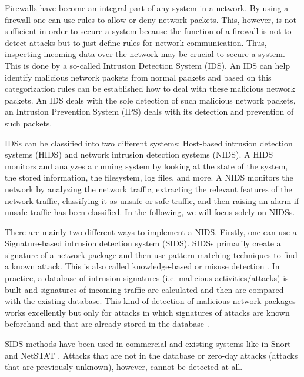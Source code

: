 \documentclass[]{article}
\begin{document}
	\noindent
	Firewalls have become an integral part of any system in a network. By using a firewall one can use rules to allow or deny network packets. This, however, is not sufficient in order to secure a system because the function of a firewall is not to detect attacks but to just define rules for network communication. Thus, inspecting incoming data over the network may be crucial to secure a system. This is done by a so-called Intrusion Detection System (IDS). An IDS can help identify malicious network packets from normal packets and based on this categorization rules can be established how to deal with these malicious network packets. An IDS deals with the sole detection of such malicious network packets, an Intrusion Prevention System (IPS) deals with its detection and prevention of such packets. 
	\newline
	
	\noindent
	IDSs can be classified into two different systems: Host-based intrusion detection systems (HIDS) and network intrusion detection systems (NIDS). A HIDS monitors and analyzes a running system by looking at the state of the system, the stored information, the filesystem, log files, and more. A NIDS monitors the network by analyzing the network traffic, extracting the relevant features of the network traffic, classifying it as unsafe or safe traffic, and then raising an alarm if unsafe traffic has been classified. In the following, we will focus solely on NIDSs.
	\newline
	
	\noindent
	There are mainly two different ways to implement a NIDS. Firstly, one can use a Signature-based intrusion detection system (SIDS). SIDSs primarily create a signature of a network package and then use pattern-matching techniques to find a known attack. This is also called knowledge-based or misuse detection \cite{10.1007/978-3-030-04503-6_14}. In practice, a database of intrusion signatures (i.e. malicious activities/attacks) is built and signatures of incoming traffic are calculated and then are compared with the existing database. This kind of detection of malicious network packages works excellently but only for attacks in which signatures of attacks are known beforehand and that are already stored in the database \cite{10.1145/972374.972384}. 
	
	SIDS methods have been used in commercial and existing systems like in Snort \cite{roesch1999snort} and NetSTAT \cite{vigna1999netstat}. Attacks that are not in the database or zero-day attacks (attacks that are previously unknown), however, cannot be detected at all. 
	
\end{document}
